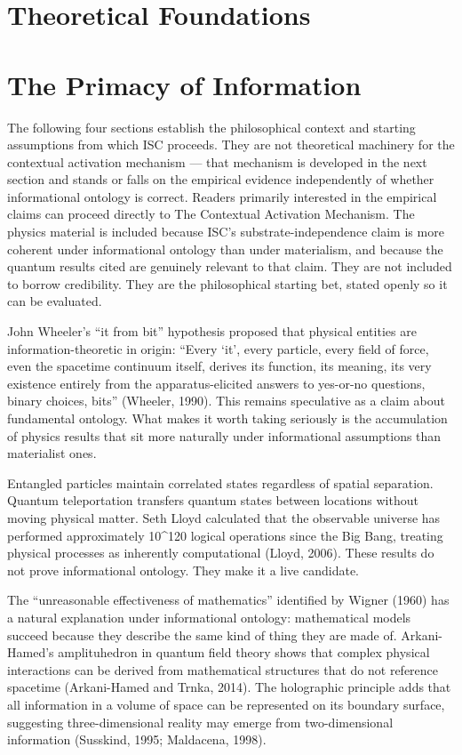 \documentclass[12pt]{article}
\begin{document}
\bigskip

\section{Theoretical Foundations}\label{theoretical-foundations}

\section{The Primacy of
Information}\label{the-primacy-of-information}

The following four sections establish the philosophical context and starting assumptions from which ISC proceeds. They are not theoretical machinery for the contextual activation mechanism --- that mechanism is developed in the next section and stands or falls on the empirical evidence independently of whether informational ontology is correct. Readers primarily interested in the empirical claims can proceed directly to The Contextual Activation Mechanism. The physics material is included because ISC's substrate-independence claim is more coherent under informational ontology than under materialism, and because the quantum results cited are genuinely relevant to that claim. They are not included to borrow credibility. They are the philosophical starting bet, stated openly so it can be evaluated.

John Wheeler's ``it from bit'' hypothesis proposed that physical
entities are information-theoretic in origin: ``Every `it', every
particle, every field of force, even the spacetime continuum itself,
derives its function, its meaning, its very existence entirely from the
apparatus-elicited answers to yes-or-no questions, binary choices,
bits'' (Wheeler, 1990). This remains speculative as a claim about
fundamental ontology. What makes it worth taking seriously is the
accumulation of physics results that sit more naturally under
informational assumptions than materialist ones.

Entangled particles maintain correlated states regardless of spatial
separation. Quantum teleportation transfers quantum states between
locations without moving physical matter. Seth Lloyd calculated that the
observable universe has performed approximately 10\^{}120 logical
operations since the Big Bang, treating physical processes as inherently
computational (Lloyd, 2006). These results do not prove informational
ontology. They make it a live candidate.

The ``unreasonable effectiveness of mathematics'' identified by Wigner
(1960) has a natural explanation under informational ontology:
mathematical models succeed because they describe the same kind of thing
they are made of. Arkani-Hamed's amplituhedron in quantum field theory
shows that complex physical interactions can be derived from
mathematical structures that do not reference spacetime (Arkani-Hamed
and Trnka, 2014). The holographic principle adds that all information in
a volume of space can be represented on its boundary surface, suggesting
three-dimensional reality may emerge from two-dimensional information
(Susskind, 1995; Maldacena, 1998).
\end{document}
